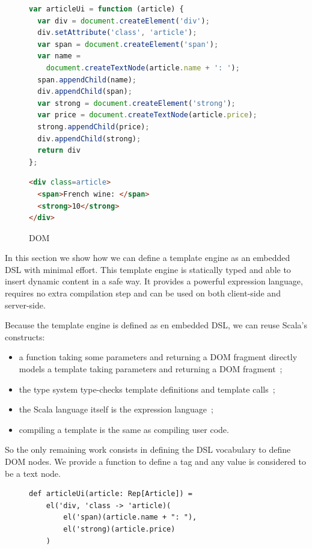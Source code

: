 \documentclass[preprint]{sigplanconf}
\begin{document}
\begin{figure}
\label{dom-api}
\begin{lstlisting}[language=JavaScript]
var articleUi = function (article) {
  var div = document.createElement('div');
  div.setAttribute('class', 'article');
  var span = document.createElement('span');
  var name =
    document.createTextNode(article.name + ': ');
  span.appendChild(name);
  div.appendChild(span);
  var strong = document.createElement('strong');
  var price = document.createTextNode(article.price);
  strong.appendChild(price);
  div.appendChild(strong);
  return div
};
\end{lstlisting}

\begin{lstlisting}[language=HTML]
<div class=article>
  <span>French wine: </span>
  <strong>10</strong>
</div>
\end{lstlisting}
\caption{DOM}
\end{figure}

In this section we show how we can define a template engine as an embedded DSL with minimal effort. This template
engine is statically typed and able to insert dynamic content in a safe way. It provides a powerful expression
language, requires no extra compilation step and can be used on both client-side and server-side.

Because the template engine is defined as en embedded DSL, we can reuse Scala’s constructs:

\begin{itemize}
\item a function taking some parameters and returning a DOM fragment directly models a template taking parameters and
returning a DOM fragment~;
\item the type system type-checks template definitions and template calls~;
\item the Scala language itself is the expression language~;
\item compiling a template is the same as compiling user code.
\end{itemize}

So the only remaining work consists in defining the DSL vocabulary to define DOM nodes. We provide a 
function to define a tag and any  value is considered to be a text node.

\begin{figure}
\begin{lstlisting}[label=forest,caption=DOM definition DSL]
def articleUi(article: Rep[Article]) =
    el('div, 'class -> 'article)(
        el('span)(article.name + ": "),
        el('strong)(article.price)
    )
\end{lstlisting}
\end{figure}
\end{document}
